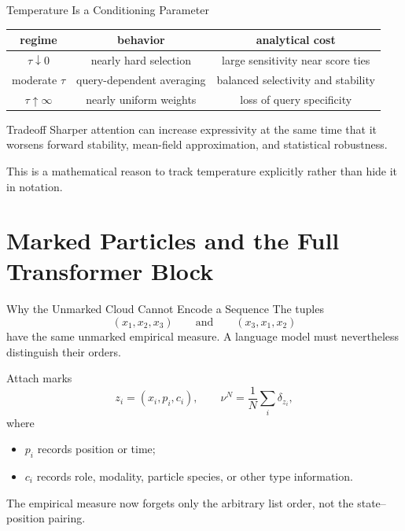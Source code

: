 \documentclass[aspectratio=169,11pt]{beamer}
\begin{document}
\begin{frame}{Temperature Is a Conditioning Parameter}
\begin{center}
\begin{tabular}{c|c|c}
regime & behavior & analytical cost \\
\hline
$\tau\downarrow0$ & nearly hard selection & large sensitivity near score ties \\
moderate $\tau$ & query-dependent averaging & balanced selectivity and stability \\
$\tau\uparrow\infty$ & nearly uniform weights & loss of query specificity
\end{tabular}
\end{center}

\begin{alertblock}{Tradeoff}
Sharper attention can increase expressivity at the same time that it worsens forward stability, mean-field approximation, and statistical robustness.
\end{alertblock}

This is a mathematical reason to track temperature explicitly rather than hide it in notation.
\end{frame}

\section{Marked Particles and the Full Transformer Block}

\begin{frame}{Why the Unmarked Cloud Cannot Encode a Sequence}
The tuples
\[
 (x_1,x_2,x_3)
 \qquad\text{and}\qquad
 (x_3,x_1,x_2)
\]
have the same unmarked empirical measure.  A language model must nevertheless distinguish their orders.

Attach marks
\[
 z_i=(x_i,p_i,c_i),
 \qquad
 \nu^N=\frac1N\sum_i\delta_{z_i},
\]
where
\begin{itemize}
\item $p_i$ records position or time;
\item $c_i$ records role, modality, particle species, or other type information.
\end{itemize}

The empirical measure now forgets only the arbitrary list order, not the state--position pairing.
\end{frame}
\end{document}
